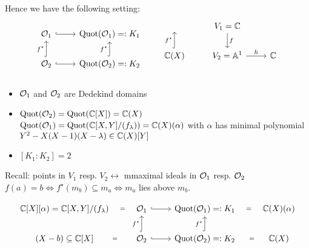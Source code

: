 \begin{conc}
Hence we have the following setting:
\[
\begin{tikzcd}
\O_1 \arrow[r, hook] & \Quot(\O_1)=:K_1\\
\O_2 \arrow[u, hook, "f^\star"] \arrow[r, hook] & \Quot(\O_2)=:K_2 \arrow[u, hook, "f^\star"]
\end{tikzcd}
\quad \quad 
\begin{tikzcd}
\ &V_1=\C \arrow[d, "f"]&\ \\
\C(X) \arrow[u, hook, "f^\star"]&V_2=\Aff^1 \arrow[r, "h"]& \C \\
\end{tikzcd}
\]
\begin{itemize}
\item $\mathcal{O}_1$ and $\mathcal{O}_2$ are Dedekind domains
\item $\operatorname{Quot}(\mathcal{O}_2)=\operatorname{Quot}(\mathbb{C}[X])=\mathbb{C}(X)$\\
$\operatorname{Quot}(\mathcal{O}_1)=\operatorname{Quot}(\mathbb{C}[X,Y]/(f_\lambda)) =\mathbb{C}(X)(\alpha)$ with $\alpha$ has minimal polynomial $Y^2-X(X-1)(X-\lambda) \in \mathbb{C}(X)[Y]$
\item $[K_1:K_2]=2$
\end{itemize}
\end{conc}

Recall: points in $V_1$ resp. $V_2 \leftrightarrow $ mmaximal ideals in $\mathcal{O}_1$ resp. $\mathcal{O}_2$\\
$f(a)=b \iff f^\star(m_b) \subseteq m_a \iff m_a$ lies above $m_b$.

\[
\begin{tikzcd}
\C[X][\alpha)=\C[X,Y]/(f_\lambda) \arrow[draw=none]{r}[sloped,auto=false]{=} &\O_1 \arrow[r, hook] & \Quot(\O_1)=:K_1 \arrow[draw=none]{r}[sloped,auto=false]{=} & \C(X)(\alpha)\\
(X-b) \subseteq \C[X] \arrow[draw=none]{r}[sloped,auto=false]{=} &\O_2 \arrow[u, hook, "f^\star"] \arrow[r, hook] & \Quot(\O_2)=:K_2 \arrow[u, hook, "f^\star"] \arrow[draw=none]{r}[sloped,auto=false]{=}&\C(X) 
\end{tikzcd}
\]

